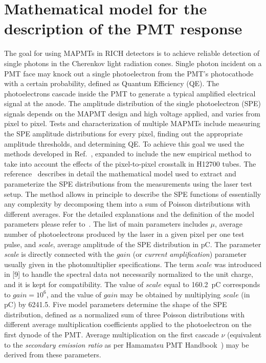 \section{Mathematical model for the description of the PMT response}

The goal for using MAPMTs in RICH detectors is to achieve reliable detection of single photons in the Cherenkov light radiation cones. Single photon incident on a PMT face may knock out a single photoelectron from the PMT's photocathode with a certain probability, defined as Quantum Efficiency (QE). The photoelectrons cascade inside the PMT to generate a typical amplified electrical signal at the anode. The amplitude distribution of the single photoelectron (SPE) signals depends on the MAPMT design and high voltage applied, and varies from pixel to pixel. Tests and characterization of multiple MAPMTs include measuring the SPE amplitude distributions for every pixel, finding out the appropriate amplitude thresholds, and determining QE. To achieve this goal we used the methods developed in Ref.~\cite{DEGTIARENKO20171}, expanded to include the new empirical method to take into account the effects of the pixel-to-pixel crosstalk in H12700 tubes. The reference~\cite{DEGTIARENKO20171} describes in detail the mathematical model used to extract and parameterize the SPE distributions from the measurements using the laser test setup. The method allows in principle to describe the SPE functions of essentially any complexity by decomposing them into a sum of Poisson distributions with different averages. For the detailed explanations and the definition of the model parameters please refer to~\cite{DEGTIARENKO20171}. The list of main parameters includes $\mu$, average number of photoelectrons produced by the laser in a given pixel per one test pulse, and {\it{scale}}, average amplitude of the SPE distribution in pC. 
The parameter {\it{scale}} is directly connected with the $gain$ (or {\it{current amplification}}) parameter usually given in the photomultiplier specifications. The term $scale$ was introduced in [9] to handle the spectral data not necessarily normalized to the unit charge, and it is kept for compatibility. The value of $scale$ equal to 160.2~pC corresponds to $gain=10^6$, and the value of $gain$ may be obtained by multiplying $scale$ (in pC) by 6241.5.
Five model parameters determine the shape of the SPE distribution, defined as a normalized sum of three Poisson distributions with different average multiplication coefficients  applied to the photoelectron on the first dynode of the PMT. Average multiplication on the first cascade ${\nu}$ (equivalent to the {\it secondary emission ratio} as per Hamamatsu PMT Handbook~\cite{Hamamatsu4thedition}) may be derived from these parameters. 

